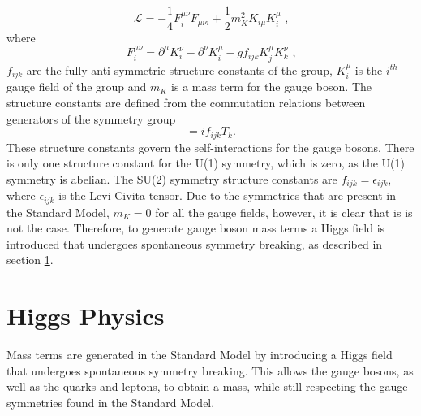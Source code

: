 %
\begin{equation}
\mathcal{L} = -\frac{1}{4}F^{{\mu}{\nu}}_{i}F_{{\mu}{\nu}{i}} + \frac{1}{2}m_{K}^{2}K_{i\mu}K^{\mu}_{i} \text{ ,} 
\end{equation}
%
\noindent where
%
\begin{equation}
F^{{\mu}{\nu}}_{i} = \partial^{\mu}K^{\nu}_{i} - \partial^{\nu}K^{\mu}_{i} - gf_{ijk}K^{\mu}_{j}K^{\nu}_{k} \text{ ,} 
\end{equation}
%
\noindent $f_{ijk}$ are the fully anti-symmetric structure constants of the group, $K^{\mu}_{i}$ is the $i^{th}$ gauge field of the group and $m_{K}$ is a mass term for the gauge boson.  The structure constants are defined from the commutation relations between generators of the symmetry group
%
\begin{equation}
[T_{i},T_{j}] = if_{ijk}T_{k} \text{.} 
\end{equation}
%
\noindent These structure constants govern the self-interactions for the gauge bosons.  There is only one structure constant for the U(1) symmetry, which is zero, as the U(1) symmetry is abelian.  The SU(2) symmetry structure constants are $f_{ijk} = \epsilon_{ijk}$, where $\epsilon_{ijk}$ is the Levi-Civita tensor.  Due to the symmetries that are present in the Standard Model, $m_{K} = 0$ for all the gauge fields, however, it is clear that is is not the case.  Therefore, to generate gauge boson mass terms a Higgs field is introduced that undergoes spontaneous symmetry breaking, as described in section \ref{sec:higgsphysics}. 


\section{Higgs Physics}
\label{sec:higgsphysics}
Mass terms are generated in the Standard Model by introducing a Higgs field that undergoes spontaneous symmetry breaking.  This allows the gauge bosons, as well as the quarks and leptons, to obtain a mass, while still respecting the gauge symmetries found in the Standard Model.  


